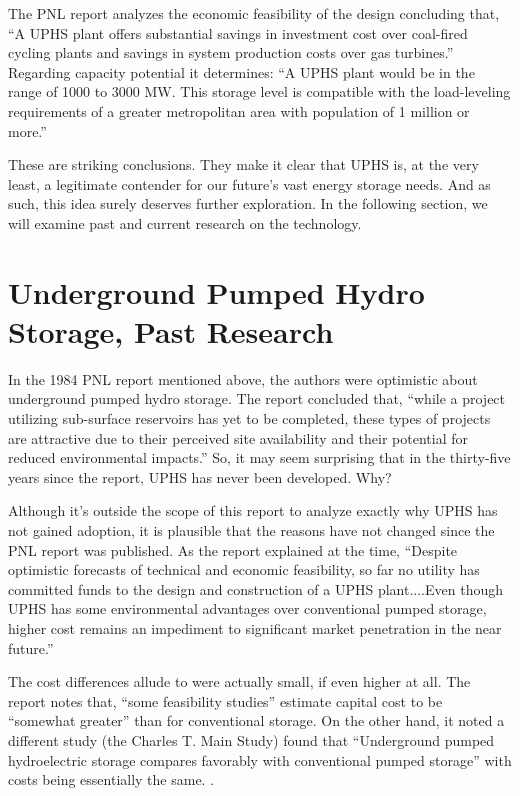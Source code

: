 \documentclass[hidelinks,12pt,a4paper]{article}
\begin{document}
The PNL report analyzes the economic feasibility of the design concluding that, “A UPHS plant offers substantial savings in investment cost over coal-fired cycling plants and savings in system production costs over gas turbines.” \cite{UndergroundPumpedHydroelectricStorage} Regarding capacity potential it determines: “A UPHS plant would be in the range of 1000 to 3000 MW. This storage level is compatible with the load-leveling requirements of a greater metropolitan area with population of 1 million or more.” \cite{SubSurfacePumpedHydroelectricStorage}

These are striking conclusions. They make it clear that UPHS is, at the very least, a legitimate contender for our future's vast energy storage needs. And as such, this idea surely deserves further exploration. In the following section, we will examine past and current research on the technology.

\pagebreak[4]
\section{Underground Pumped Hydro Storage, Past Research}
In the 1984 PNL report mentioned above, the authors were optimistic about underground pumped hydro storage. The report concluded that, “while a project utilizing sub-surface reservoirs has yet to be completed, these types of projects are attractive due to their perceived site availability and their potential for reduced environmental impacts.” \cite{SubSurfacePumpedHydroelectricStorage} So, it may seem surprising that in the thirty-five years since the report, UPHS has never been developed. Why?

Although it's outside the scope of this report to analyze exactly why UPHS has not gained adoption, it is plausible that the reasons have not changed since the PNL report was published. As the report explained at the time, “Despite optimistic forecasts of technical and economic feasibility, so far no utility has committed funds to the design and construction of a UPHS plant....Even though UPHS has some environmental advantages over conventional pumped storage, higher cost remains an impediment to significant market penetration in the near future.” \cite{SubSurfacePumpedHydroelectricStorage}

The cost differences allude to were actually small, if even higher at all. The report notes that, “some feasibility studies” estimate capital cost to be “somewhat greater” than for conventional storage. \cite{SubSurfacePumpedHydroelectricStorage} On the other hand, it noted a different study (the Charles T. Main Study) found that “Underground pumped hydroelectric storage compares favorably with conventional pumped storage” with costs being essentially the same. \cite{SubSurfacePumpedHydroelectricStorage}.
\end{document}
